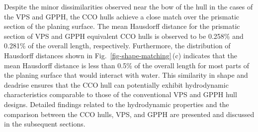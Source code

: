 Despite the minor dissimilarities observed near the bow of the hull in the cases of the VPS and GPPH, the CCO hulls achieve a close match over the prismatic section of the planing surface. The mean Hausdorff distance for the prismatic section of VPS and GPPH equivalent CCO hulls is observed to be 0.258\% and 0.281\% of the overall length, respectively.  Furthermore, the distribution of Hausdorff distances shown in Fig.~\ref{fig-shape-matching}\,(c) indicates that the mean Hausdorff distance is less than 0.5\% of the overall length for most parts of the planing surface that would interact with water. This similarity in shape and deadrise ensures that the CCO hull can potentially exhibit hydrodynamic characteristics comparable to those of the conventional VPS and GPPH hull designs. Detailed findings related to the hydrodynamic properties and the comparison between the CCO hulls, VPS, and GPPH are presented and discussed in the subsequent sections.

